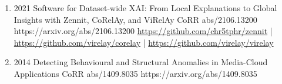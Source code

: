 {\begin{enumerate}
        \item {}
                        {2021}
                        {Software for Dataset-wide XAI: From Local Explanations to Global Insights with Zennit, CoRelAy, and ViRelAy}
                        {CoRR abs/2106.13200}
                        {https://arxiv.org/abs/2106.13200}
                        {   \href{https://github.com/chr5tphr/zennit}{https://github.com/chr5tphr/zennit} | \\
                            \href{https://github.com/virelay/corelay}{https://github.com/virelay/corelay} |
                            \href{https://github.com/virelay/virelay}{https://github.com/virelay/virelay}
                        }

        \item {}
                        {2014}
                        {Detecting Behavioural and Structural Anomalies in Media-Cloud Applications}
                        {CoRR abs/1409.8035}
                        {https://arxiv.org/abs/1409.8035}

    \end{enumerate}

}
